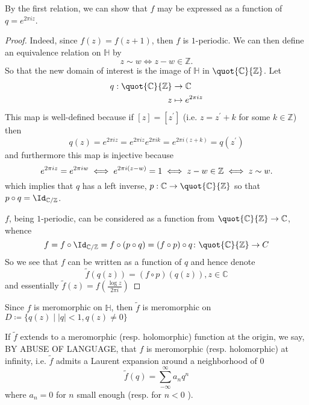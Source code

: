 \documentclass[12pt]{article}
\theoremstyle{definition}
\begin{document}
By the first relation, we can show that \(f\) may be expressed as a function of \(q=e^{2 \pi i z}\). 
\begin{proof}
Indeed, since \(f(z)=f(z+1)\), then \(f\) is \(1\)-periodic. We can then define an equivalence relation on \(\mathbb{H}\) by
\[
    z \sim w \iff z - w \in \mathbb{Z}.
\]     
So that the new domain of interest is the image of \(\mathbb{H}\) in \(\quot{\mathbb{C} }{\mathbb{Z} } \). Let 
\begin{align*}
q: \quot{\mathbb{C} }{\mathbb{Z} } &\to \mathbb{C} \\
z &\mapsto e^{2\pi iz} 
\end{align*}
This map is well-defined because if \([z]=[z^{\prime} ]\) (i.e. \(z = z^{\prime} +k\) for some \(k \in \mathbb{Z} \)) then
\[
    q(z) = e^{2\pi  i z} = e^{2\pi i z}e^{2\pi i k} = e^{2\pi i(z+k)} = q(z^{\prime} )
\] 
and furthermore this map is injective because
\[
    e^{2 \pi i z} = e^{2\pi i w} \iff e^{2\pi i (z - w)} = 1 \iff z - w \in \Bbb{Z} \iff z \sim w.
\]
which implies that \(q\) has a left inverse, \(p: \mathbb{C} \to \quot{\mathbb{C} }{\mathbb{Z} } \) so that \(p\circ q = \Id_{ \mathbb{C} / \mathbb{Z} } \). 

\(f\), being \(1\)-periodic, can be considered as a function from \(\quot{\mathbb{C} }{\mathbb{Z} } \to \mathbb{C} \), whence
\[
    f = f \circ \Id_{\mathbb{C} /\mathbb{Z} } = f \circ (p \circ q) = (f \circ p) \circ q \colon \quot{\mathbb{C} }{\mathbb{Z} } \to  C 
\]
So we see that \(f\) can be written as a function of \(q\) and hence denote \[\widetilde{f}(q(z)) = (f \circ p)(q(z)), z\in \mathbb{C}  \]  
and essentially \(\widetilde{f}(z) = f \left(\frac{\log z}{2\pi i}\right) \) 
\end{proof}  
Since \(f\) is meromorphic on \(\mathbb{H}\), then \(\widetilde{f} \) is meromorphic on \(D\coloneqq \{ q(z) \mid |q|<1, q(z) \ne 0\} \)

If \(\widetilde{f} \) extends to a meromorphic (resp. holomorphic) function at the origin, we say, BY ABUSE OF LANGUAGE, that \(f\) is meromorphic (resp. holomorphic) at infinity, i.e. \(\widetilde{f} \) admits a Laurent expansion around a neighborhood of \(0\)
\[
    \widetilde{f}(q) = \sum_{-\infty }^{\infty} a_{n}q^n   
\]    where \(a_n = 0 \) for \(n \) small enough (resp. for \(n<0\) ).
\end{document}
